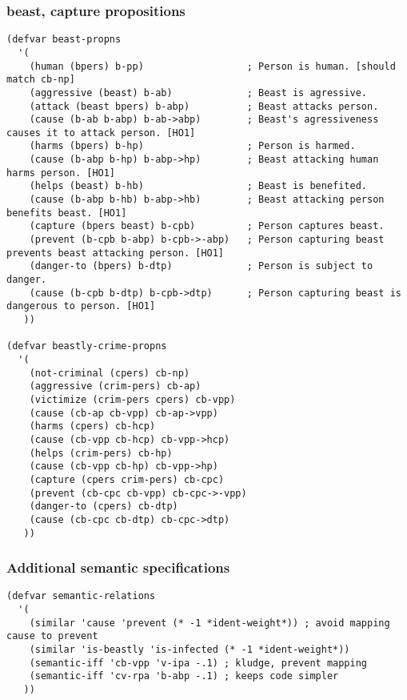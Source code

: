\documentclass[12pt,xcolor=svgnames]{beamer}
\begin{document}
\begin{frame}[fragile]\frametitle{beast, capture propositions}
\begin{lstlisting}
(defvar beast-propns
  '(
    (human (bpers) b-pp)                  ; Person is human. [should match cb-np]
    (aggressive (beast) b-ab)             ; Beast is agressive.
    (attack (beast bpers) b-abp)          ; Beast attacks person.
    (cause (b-ab b-abp) b-ab->abp)        ; Beast's agressiveness causes it to attack person. [HO1]
    (harms (bpers) b-hp)                  ; Person is harmed.
    (cause (b-abp b-hp) b-abp->hp)        ; Beast attacking human harms person. [HO1]
    (helps (beast) b-hb)                  ; Beast is benefited.
    (cause (b-abp b-hb) b-abp->hb)        ; Beast attacking person benefits beast. [HO1]
    (capture (bpers beast) b-cpb)         ; Person captures beast.
    (prevent (b-cpb b-abp) b-cpb->-abp)   ; Person capturing beast prevents beast attacking person. [HO1]
    (danger-to (bpers) b-dtp)             ; Person is subject to danger.
    (cause (b-cpb b-dtp) b-cpb->dtp)      ; Person capturing beast is dangerous to person. [HO1]
   ))

(defvar beastly-crime-propns
  '(
    (not-criminal (cpers) cb-np)
    (aggressive (crim-pers) cb-ap)
    (victimize (crim-pers cpers) cb-vpp)
    (cause (cb-ap cb-vpp) cb-ap->vpp)
    (harms (cpers) cb-hcp)
    (cause (cb-vpp cb-hcp) cb-vpp->hcp)
    (helps (crim-pers) cb-hp)
    (cause (cb-vpp cb-hp) cb-vpp->hp)
    (capture (cpers crim-pers) cb-cpc)
    (prevent (cb-cpc cb-vpp) cb-cpc->-vpp)
    (danger-to (cpers) cb-dtp)
    (cause (cb-cpc cb-dtp) cb-cpc->dtp)
   ))
\end{lstlisting}
\end{frame}

\begin{frame}[fragile]\frametitle{Additional semantic specifications}
\begin{lstlisting}
(defvar semantic-relations
  '(
    (similar 'cause 'prevent (* -1 *ident-weight*)) ; avoid mapping cause to prevent
    (similar 'is-beastly 'is-infected (* -1 *ident-weight*))
    (semantic-iff 'cb-vpp 'v-ipa -.1) ; kludge, prevent mapping
    (semantic-iff 'cv-rpa 'b-abp -.1) ; keeps code simpler
   ))
\end{lstlisting}
\end{frame}
\end{document}
